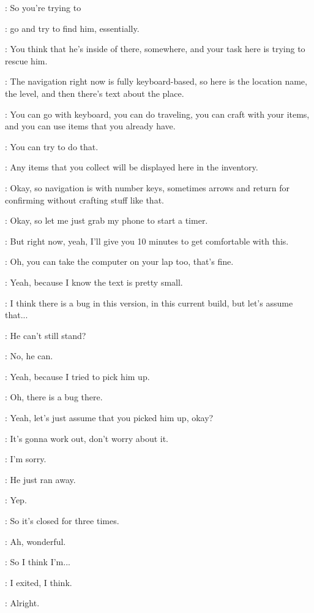 \Gabriel: So you're trying to

\Gabriel: go and try to find him, essentially.

\Gabriel: You think that he's inside of there, somewhere, and your task here is trying to rescue him.

\Gabriel: The navigation right now is fully keyboard-based, so here is the location name, the level, and then there's text about the place.

\Gabriel: You can go with keyboard, you can do traveling, you can craft with your items, and you can use items that you already have.

\Gabriel: You can try to do that.

\Gabriel: Any items that you collect will be displayed here in the inventory.

\Gabriel: Okay, so navigation is with number keys, sometimes arrows and return for confirming without crafting stuff like that.

\Gabriel: Okay, so let me just grab my phone to start a timer.

\Gabriel: But right now, yeah, I'll give you 10 minutes to get comfortable with this.

\Gabriel: Oh, you can take the computer on your lap too, that's fine.

\Gabriel: Yeah, because I know the text is pretty small.

\Gabriel: I think there is a bug in this version, in this current build, but let's assume that...

\Kacper: He can't still stand?

\Kacper: No, he can.

\Kacper: Yeah, because I tried to pick him up.

\Gabriel: Oh, there is a bug there.

\Gabriel: Yeah, let's just assume that you picked him up, okay?

\Kacper: It's gonna work out, don't worry about it.

\Kacper: I'm sorry.

\Kacper: He just ran away.

\Gabriel: Yep.

\Kacper: So it's closed for three times.

\Gabriel: Ah, wonderful.

\Kacper: So I think I'm...

\Kacper: I exited, I think.

\Gabriel: Alright.

